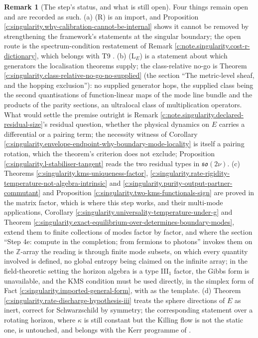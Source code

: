\documentclass[11pt]{article}
\theoremstyle{definition}
\newtheorem{remark}[theorem]{Remark}
\theoremstyle{plain}
\begin{document}
\begin{remark}[The step's status, and what is still open]
Four things remain open and are recorded as such. (a) (R) is an import, and Proposition \ref{c:singularity.why-calibration-cannot-be-internal} shows it cannot be removed by strengthening the framework's statements at the singular boundary; the open route is the spectrum-condition restatement of Remark \ref{c:note.singularity.cost-r-dictionary}, which belongs with T9 \cite{ButlerT9}. (b) (L$_E$) is a statement about which generators the localisation theorems supply; the class-relative no-go is Theorem \ref{c:singularity.class-relative-no-go-no-supplied} (the section ``The metric-level sheaf, and the hopping exclusion''): no supplied generator hops, the supplied class being the second quantisations of function-linear maps of the mode line bundle and the products of the parity sections, an ultralocal class of multiplication operators. What would settle the premise outright is Remark \ref{c:note.singularity.declared-residual-size}'s residual question, whether the physical dynamics on $E$ carries a differential or a pairing term; the necessity witness of Corollary \ref{c:singularity.envelope-endpoint-why-boundary-mode-locality} is itself a pairing rotation, which the theorem's criterion does not exclude; Proposition \ref{c:singularity.l-stabiliser-tangent} reads the two residual types in $\mathfrak{so}(2\nu)$. (c) Theorems \ref{c:singularity.kms-uniqueness-factor}, \ref{c:singularity.rate-rigidity-temperature-not-algebra-intrinsic} and \ref{c:singularity.purity-output-partner-commutant} and Proposition \ref{c:singularity.two-kms-functionals-sign} are proved in the matrix factor, which is where this step works, and their multi-mode applications, Corollary \ref{c:singularity.universality-temperature-under-g} and Theorem \ref{c:singularity.exact-equilibrium-over-determines-boundary-modes}, extend them to finite collections of modes factor by factor, and where the section ``Step 4e: compute in the completion; from fermions to photons'' invokes them on the $\mathbb{Z}$-array the reading is through finite mode subsets, on which every quantity involved is defined, no global entropy being claimed on the infinite array; in the field-theoretic setting the horizon algebra is a type III$_1$ factor, the Gibbs form is unavailable, and the KMS condition must be used directly, in the simplex form of Fact \ref{c:singularity.imported-general-form}, with \cite{KayWald1991} as the template. (d) Theorem \ref{c:singularity.rate-discharge-hypothesis-iii} treats the sphere directions of $E$ as inert, correct for Schwarzschild by symmetry; the corresponding statement over a rotating horizon, where $\kappa$ is still constant but the Killing flow is not the static one, is untouched, and belongs with the Kerr programme of \cite{ButlerT4, ButlerT6}.
\end{remark}
\end{document}
